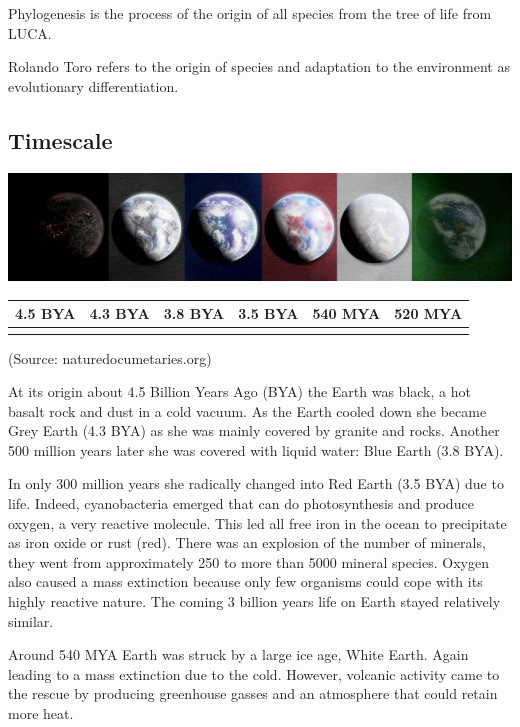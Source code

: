 \documentclass[
  11pt,
]{book}
\begin{document}
Phylogenesis is the process of the origin of all species from the tree of life from LUCA.

Rolando Toro refers to the origin of species and adaptation to the environment as evolutionary differentiation.

\hypertarget{timescale}{%
\subsection{Timescale}\label{timescale}}

\includegraphics{./figs/liferockystartstrip.jpeg}

\begin{longtable}[]{@{}llllll@{}}
\toprule()
4.5 BYA & 4.3 BYA & 3.8 BYA & 3.5 BYA & 540 MYA & 520 MYA \\
\midrule()
\endhead
& & & & & \\
\bottomrule()
\end{longtable}

(Source: naturedocumetaries.org)

At its origin about 4.5 Billion Years Ago (BYA) the Earth was black, a hot basalt rock and dust in a cold vacuum.
As the Earth cooled down she became Grey Earth (4.3 BYA) as she was mainly covered by granite and rocks. Another 500 million years later she was covered with liquid water: Blue Earth (3.8 BYA).

In only 300 million years she radically changed into Red Earth (3.5 BYA) due to life. Indeed, cyanobacteria emerged that can do photosynthesis and produce oxygen, a very reactive molecule. This led all free iron in the ocean to precipitate as iron oxide or rust (red). There was an explosion of the number of minerals, they went from approximately 250 to more than 5000 mineral species. Oxygen also caused a mass extinction because only few organisms could cope with its highly reactive nature. The coming 3 billion years life on Earth stayed relatively similar.

Around 540 MYA Earth was struck by a large ice age, White Earth.
Again leading to a mass extinction due to the cold. However, volcanic activity came to the rescue by producing greenhouse gasses and an atmosphere that could retain more heat.
\end{document}
